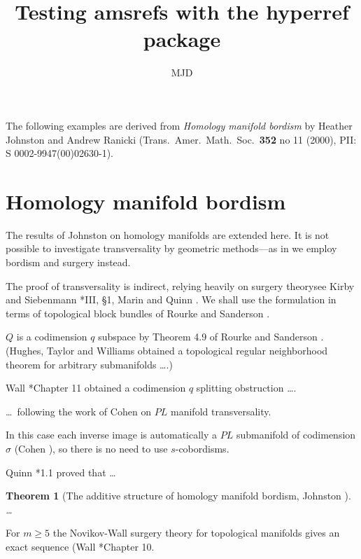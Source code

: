 \documentclass{article}
\newtheorem{thm}{Theorem}[section]
\begin{document}
\title{Testing amsrefs with the hyperref package}
\author{MJD}
\maketitle

   The following examples are derived from
   \emph{Homology manifold bordism} by Heather Johnston and Andrew
   Ranicki (Trans.\ Amer.\ Math.\ Soc.\ \textbf{352} no 11 (2000), PII: S
   0002-9947(00)02630-1).

\setcounter{section}{3}
\section{Homology manifold bordism}

The results of Johnston \cite{Jo} on homology
manifolds are extended here. It is not
possible to investigate transversality by
geometric methods---as in \cite{Jo} we employ
bordism and surgery instead.

The proof of transversality is indirect,
relying heavily on surgery theory\mdash see
Kirby and Siebenmann \cite{KS}*{III, \S 1},
Marin \cite{M} and Quinn \cite{Q3}. We shall
use the formulation in terms of topological
block bundles of Rourke and Sanderson
\cite{RS}.

$Q$ is a codimension $q$ subspace by Theorem
4.9 of Rourke and Sanderson \cite{RS}.
(Hughes, Taylor and Williams \cite{HTW}
obtained a topological regular neighborhood
theorem for arbitrary submanifolds \dots.)

Wall \cite{Wa}*{Chapter 11} obtained a
codimension $q$ splitting obstruction \dots.

\dots\ following the work of Cohen \cite{Co}
on $PL$ manifold transversality.

In this case each inverse image is
automatically a $PL$ submanifold of
codimension $\sigma$ (Cohen \cite{Co}), so
there is no need to use $s$-cobordisms.

Quinn \cite{Q2}*{1.1} proved that \dots

\begin{thm}[The additive structure of
  homology manifold bordism, Johnston
  \cite{Jo}]
\dots
\end{thm}

For $m\geq 5$ the Novikov-Wall surgery theory
for topological manifolds gives an exact
sequence (Wall \cite{Wa}*{Chapter 10}.
\end{document}
